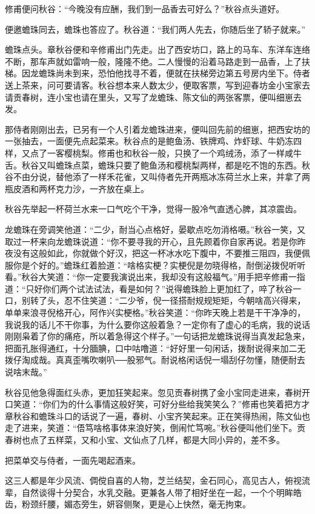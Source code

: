 \documentclass[12pt,UTF8]{ctexbook}
\begin{document}
{{{修甫便问秋谷：“今晚没有应酬，我们到一品香去可好么？”秋谷点头道好。

便邀蟾珠同去，蟾珠也答应了。秋谷道：“我们两人先去，你随后坐了轿子就来。”

蟾珠点头。章秋谷便和辛修甫出门先走。出了西安坊口，路上的马车、东洋车连络不断，那车声就如雷响一般，隆隆不绝。二人慢慢的沿着马路走到一品香，上了扶梯。因龙蟾珠尚未到来，恐怕他找寻不着，便就在扶梯旁边第五号房内坐下。侍者送上茶来，问可要请客。秋谷想本来人数太少，便取客票，写到迎春坊金小宝家去请贡春树，连小宝也请在里头，又写了龙蟾珠、陈文仙的两张客票，便叫细崽去发。

那侍者刚刚出去，已另有一个人引着龙蟾珠进来，便叫回先前的细崽，把西安坊的一张抽去，一面便先点起菜来。秋谷点的是鲍鱼汤、铁牌鸡、炸虾球、牛奶冻四样，又点了一客樱桃梨。修甫也和秋谷一般，只换了一个鸡绒汤，添了一样咸牛舌。秋谷又叫蟾珠点菜，蟾珠只要了鲍鱼汤和樱桃梨两样，都是吃不饱的东西。秋谷不由分说，替他添了一样禾花雀，又叫侍者先开两瓶冰冻荷兰水上来，并拿了两瓶皮酒和两杯克力沙，一齐放在桌上。

秋谷先举起一杯荷兰水来一口气吃个干净，觉得一股冷气直透心脾，其凉震齿。

龙蟾珠在旁调笑他道：“二少，耐当心点格好，晏歇点吃勿消格嗫。”秋谷一笑，又取过一杯来向龙蟾珠说道：“你不要寻我的开心，且先顾着你自家再说。若是你昨夜没有这般如此，你就做个好汉，把这一杯冰水吃下腹中，不要推三阻四，我便佩服你是个好的。”蟾珠红着脸道：“啥格实梗？实梗倪是勿晓得格，耐倒泌拨倪听听看。”秋谷大笑道：“你一定要我演说出来，我却没有这般福气。”用手把辛修甫一指道：“只好你们两个试法试法，看是如何？”说得蟾珠脸上更加红了，啐了秋谷一口，别转了头，忍不住笑道：“二少爷，倪一径搭耐规规矩矩，今朝啥高兴得来，单单来浪寻倪格开心，阿作兴实梗格。”秋谷笑道：“你昨天晚上若是干干净净的，我说我的话儿不干你事，为什么要你这般着急？一定你有了虚心的毛病，我的说话刚刚枭着了你的痛疮，所以着急得这个样子。”一句话把龙蟾珠说得当真发起急来，把面孔胀得通红，十分腼腆，口中咕噜道：“好好里一句闲话，拨耐说得来加二无拨仔淘成哉。真真歪嘴吹喇叭──股邪气。耐说格闲话倪一塌刮仔勿懂，随便耐去说啥末哉。”

秋谷见他急得面红头赤，更加狂笑起来。忽见贡春树携了金小宝同走进来，春树开口笑道：“你们为的什么事情这般好笑，可好分些给我笑笑么？”修甫也笑着把方才章秋谷和蟾珠斗口的话说了一遍，春树、小宝齐笑起来。正在笑得热闹，陈文仙也走了进来，笑道：“俉笃啥格事体来浪好笑，倒闹忙笃啘。”秋谷便叫他们坐下。贡春树也点了五样菜，又和小宝、文仙点了几样，都是大同小异的，差不多。

把菜单交与侍者，一面先喝起酒来。

这三人都是年少风流、倜傥自喜的人物，芝兰结契，金石同心，高见古人，俯视流辈，自然谈得十分契合，水乳交融。更兼各人带了相好坐在一起，一个个明眸皓齿，粉颈纤腰，媚态旁生，妍容侧聚，更是心上快然，毫无拘束。

}}}
\end{document}
